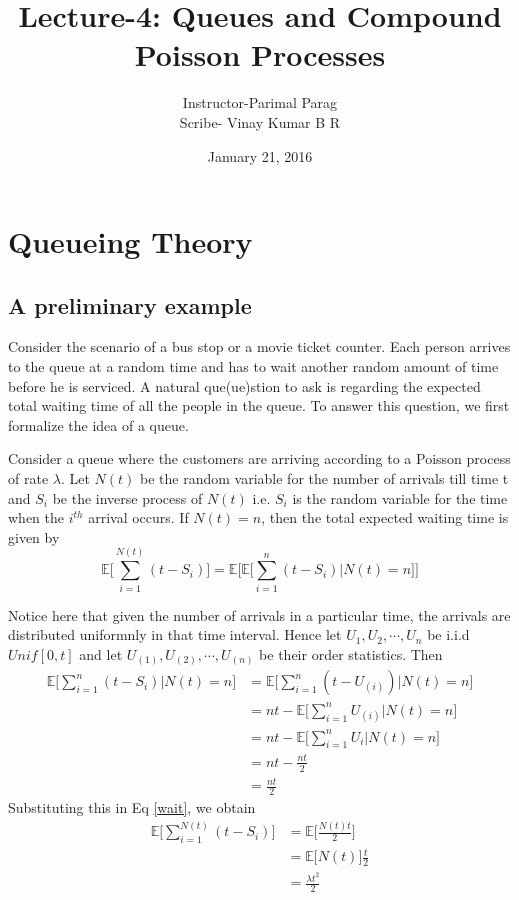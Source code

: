 \documentclass[a4paper,english,12pt]{article}
\title{Lecture-4: Queues and Compound Poisson Processes}
\author{Instructor-Parimal Parag \\
		Scribe- Vinay Kumar B R}
\date{January 21, 2016}
\begin{document}
\maketitle
\tableofcontents
\section{Queueing Theory}
\subsection{A preliminary example}
\par Consider the scenario of a bus stop or a movie ticket counter. Each person arrives to the queue at a random time and has to wait another random amount of time before he is serviced. A natural que(ue)stion to ask is regarding the expected total waiting time of all the people in the queue. To answer this question, we first formalize the idea of a queue.\\
\par Consider a queue where the customers are arriving according to a Poisson process of rate $\lambda$. Let $N(t)$ be the random variable for the number of arrivals till time t and $S_i$ be the inverse process of $N(t)$ i.e. $S_i$ is the random variable for the time when the $i^{th}$ arrival occurs. If $N(t)=n$, then the total expected waiting time is given by
\begin{equation}\label{wait}
\mathbb{E}\Bigg[\sum_{i=1}^{N(t)}(t-S_i)\Bigg]=\mathbb{E}\Bigg[\mathbb{E}\Big[\sum_{i=1}^{n}(t-S_i)\Big|N(t)=n\Big]\Bigg]
\end{equation}
\par Notice here that given the number of arrivals in a particular time, the arrivals are distributed uniformnly in that time interval. Hence let $U_1, U_2, \cdots, U_n$ be i.i.d $Unif[0,t]$ and let $U_{(1)},U_{(2)},\cdots,U_{(n)}$ be their order statistics. Then
\begin{align*}
	\mathbb{E}\Bigg[\sum_{i=1}^{n}(t-S_i)|N(t)=n\Bigg] &= \mathbb{E}\Bigg[\sum_{i=1}^{n}(t-U_{(i)})\Big| N(t)=n\Bigg]\\
	&= nt-\mathbb{E}\Bigg[\sum_{i=1}^{n}U_{(i)} \Big| N(t)=n\Bigg]\\
	&= nt-\mathbb{E}\Bigg[\sum_{i=1}^{n}U_i \Big| N(t)=n\Bigg]\\
	&= nt-\frac{nt}{2}\\
	&= \frac{nt}{2}
\end{align*}
Substituting this in Eq \ref{wait}, we obtain
\begin{align*}
\mathbb{E}\Bigg[\sum_{i=1}^{N(t)}(t-S_i)\Bigg] &= \mathbb{E}\Bigg[\frac{N(t)t}{2}\Bigg]\\
&= \mathbb{E}\Big[N(t)\Big]\frac{t}{2}\\
&= \frac{\lambda t^2}{2}
\end{align*}
\end{document}
